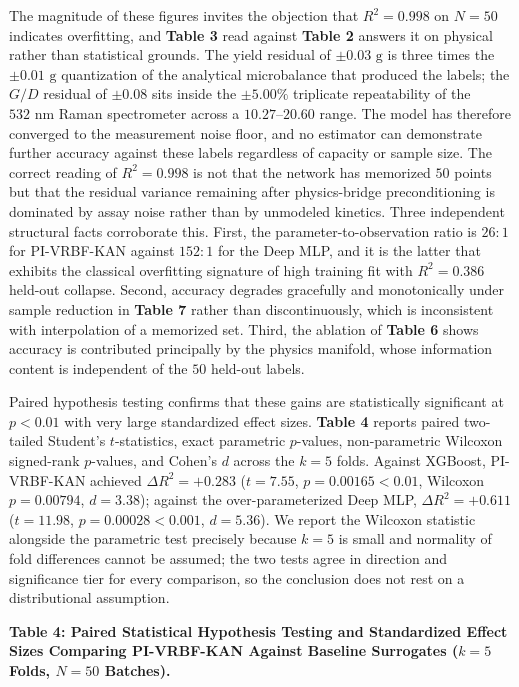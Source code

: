 \documentclass[10pt,journal,onecolumn]{IEEEtran}
\begin{document}
The magnitude of these figures invites the objection that $R^2 = 0.998$ on $N = 50$ indicates overfitting, and \textbf{Table 3} read against \textbf{Table 2} answers it on physical rather than statistical grounds. The yield residual of $\pm 0.03\text{ g}$ is three times the $\pm 0.01\text{ g}$ quantization of the analytical microbalance that produced the labels; the $G/D$ residual of $\pm 0.08$ sits inside the $\pm 5.00\%$ triplicate repeatability of the $532\text{ nm}$ Raman spectrometer across a $10.27\text{--}20.60$ range. The model has therefore converged to the measurement noise floor, and no estimator can demonstrate further accuracy against these labels regardless of capacity or sample size. The correct reading of $R^2 = 0.998$ is not that the network has memorized $50$ points but that the residual variance remaining after physics-bridge preconditioning is dominated by assay noise rather than by unmodeled kinetics. Three independent structural facts corroborate this. First, the parameter-to-observation ratio is $26 : 1$ for PI-VRBF-KAN against $152 : 1$ for the Deep MLP, and it is the latter that exhibits the classical overfitting signature of high training fit with $R^2 = 0.386$ held-out collapse. Second, accuracy degrades gracefully and monotonically under sample reduction in \textbf{Table 7} rather than discontinuously, which is inconsistent with interpolation of a memorized set. Third, the ablation of \textbf{Table 6} shows accuracy is contributed principally by the physics manifold, whose information content is independent of the $50$ held-out labels.

Paired hypothesis testing confirms that these gains are statistically significant at $p < 0.01$ with very large standardized effect sizes. \textbf{Table 4} reports paired two-tailed Student's $t$-statistics, exact parametric $p$-values, non-parametric Wilcoxon signed-rank $p$-values, and Cohen's $d$ across the $k = 5$ folds. Against XGBoost, PI-VRBF-KAN achieved $\Delta R^2 = +0.283$ ($t = 7.55$, $p = 0.00165 < 0.01$, Wilcoxon $p = 0.00794$, $d = 3.38$); against the over-parameterized Deep MLP, $\Delta R^2 = +0.611$ ($t = 11.98$, $p = 0.00028 < 0.001$, $d = 5.36$). We report the Wilcoxon statistic alongside the parametric test precisely because $k = 5$ is small and normality of fold differences cannot be assumed; the two tests agree in direction and significance tier for every comparison, so the conclusion does not rest on a distributional assumption.

\textbf{Table 4: Paired Statistical Hypothesis Testing and Standardized Effect Sizes Comparing PI-VRBF-KAN Against Baseline Surrogates ($k = 5$ Folds, $N = 50$ Batches).}
\end{document}

